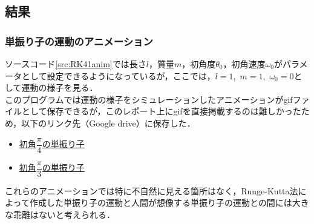 \documentclass[a4paper,11pt]{jsarticle}
\begin{document}
\newpage
\subsection{結果}
\subsubsection{単振り子の運動のアニメーション}
ソースコード\ref{src:RK41anim}では長さ\(l\)，質量\(m\)，初角度\(\theta_0\)，初角速度\(\omega_0\)がパラメータとして設定できるようになっているが，ここでは，\(l=1\),\ \(m=1\),\ \(\omega_0=0\)として運動の様子を見る．\\
このプログラムでは運動の様子をシミュレーションしたアニメーションがgifファイルとして保存できるが，このレポート上にgifを直接掲載するのは難しかったため，以下のリンク先（Google drive）に保存した．
\begin{itemize}
  \item \href{https://drive.google.com/file/d/1HEMIiebBH-CA8qKj4L7jN1CmuGO9943t/view?usp=sharing}{初角\(\dfrac{\pi}{4}\)の単振り子}
  \item \href{https://drive.google.com/file/d/1J6pF6LpVSzd1oC3yWCBBsiJDz6IESJB8/view?usp=sharing}{初角\(\dfrac{\pi}{3}\)の単振り子}
\end{itemize}
これらのアニメーションでは特に不自然に見える箇所はなく，Runge-Kutta法によって作成した単振り子の運動と人間が想像する単振り子の運動との間には大きな乖離はないと考えられる．
\end{document}

